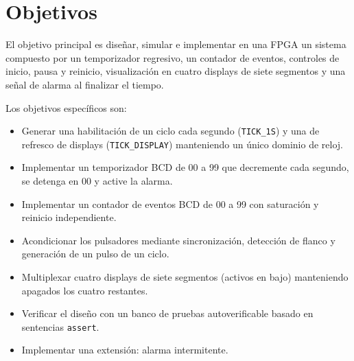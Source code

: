 \documentclass[letterpaper,12pt]{article}
\begin{document}
\section{Objetivos}
El objetivo principal es diseñar, simular e implementar en una FPGA un sistema compuesto por un temporizador regresivo, un contador de eventos, controles de inicio, pausa y reinicio, visualización en cuatro displays de siete segmentos y una señal de alarma al finalizar el tiempo.

Los objetivos específicos son:
\begin{itemize}
    \item Generar una habilitación de un ciclo cada segundo (\texttt{TICK\_1S}) y una de refresco de displays (\texttt{TICK\_DISPLAY}) manteniendo un único dominio de reloj.
    \item Implementar un temporizador BCD de 00 a 99 que decremente cada segundo, se detenga en 00 y active la alarma.
    \item Implementar un contador de eventos BCD de 00 a 99 con saturación y reinicio independiente.
    \item Acondicionar los pulsadores mediante sincronización, detección de flanco y generación de un pulso de un ciclo.
    \item Multiplexar cuatro displays de siete segmentos (activos en bajo) manteniendo apagados los cuatro restantes.
    \item Verificar el diseño con un banco de pruebas autoverificable basado en sentencias \texttt{assert}.
    \item Implementar una extensión: alarma intermitente.
\end{itemize}

\end{document}

